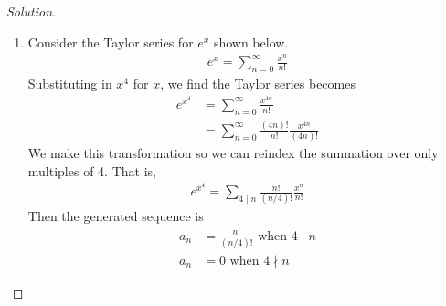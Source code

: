 \documentclass[12pt]{article}
\theoremstyle{definition}
\newenvironment{solution}{
  \begin{proof}[Solution]
    \vspace{-8px}
    \setlength{\parskip}{4px}
    \setlength{\parindent}{0px}
}{
\end{proof}
}
\begin{document}
\begin{solution}
\begin{enumerate}[label={\alph*.}]
      \item Consider the Taylor series for \(e^x\) shown below.
      \begin{align*}
        e^{x} = \sum_{n = 0}^{\infty} \frac{x^n}{n!}
      \end{align*}
      Substituting in \(x^4\) for \(x\), we find the Taylor series becomes
      \begin{align*}
        e^{x^{4}} &= \sum_{n = 0}^{\infty} \frac{x^{4n}}{n!} \\
        &= \sum_{n = 0}^{\infty} \frac{(4n)!}{n!} \frac{x^{4n}}{(4n)!}
      \end{align*}
      We make this transformation so we can reindex the summation over only multiples of 4. That is,
      \begin{align*}
        e^{x^4} = \sum_{4 \mid n} \frac{n!}{(n / 4)!} \frac{x^n}{n!}
      \end{align*}
      Then the generated sequence is
      \begin{align*}
        a_n &= \frac{n!}{(n/4)!} \text{ when } 4 \mid n \\
        a_n &= 0 \text{ when } 4 \nmid n
      \end{align*}
    \end{enumerate}
  \end{solution}
\end{document}

